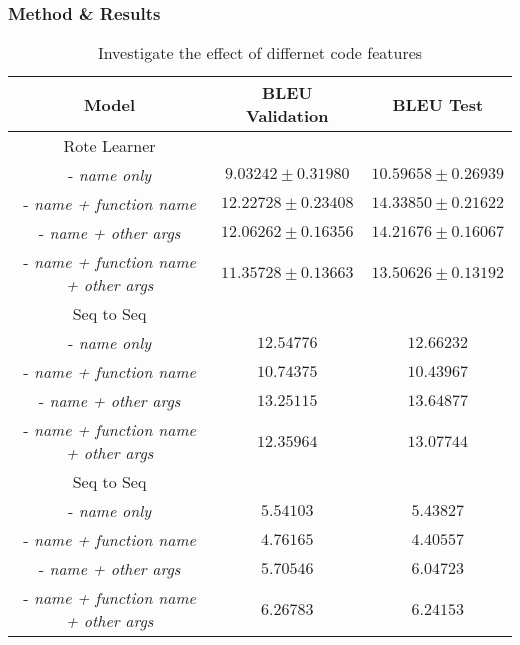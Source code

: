 \subsubsection{Method \& Results} %




\begin{table}[h!]
\begin{center}
\begin{tabular}{ c | c | c }
    Model                               & BLEU Validation            & BLEU Test  \\
    \hline
    \hline
    Rote Learner                        &                  & \\    
    - \textit{name only}                & $ 9.03242  \pm  0.31980 $ & $ 10.59658 \pm 0.26939 $  \\
    - \textit{name + function name}     & $ 12.22728 \pm  0.23408 $ & $ 14.33850 \pm 0.21622 $  \\
    - \textit{name + other args}        & $ 12.06262 \pm  0.16356 $ & $ 14.21676 \pm 0.16067 $  \\
    - \textit{name + function name + other args}  & $ 11.35728 \pm  0.13663 $ & $ 13.50626 \pm 0.13192 $ \\
    \hline
    \hline
    Seq to Seq                          &                  & \\
    - \textit{name only}                & $ 12.54776 $ & $ 12.66232 $  \\
    - \textit{name + function name}     & $ 10.74375 $ & $ 10.43967 $  \\
    - \textit{name + other args}        & $ 13.25115 $ & $ 13.64877 $  \\
    - \textit{name + function name + other args}    & $ 12.35964 $ & $ 13.07744 $  \\

    \hdashline
    Seq to Seq                          &                  & \\
    - \textit{name only}                & $ 5.54103 $ & $ 5.43827 $  \\
    - \textit{name + function name}     & $ 4.76165 $ & $ 4.40557 $  \\
    - \textit{name + other args}        & $ 5.70546 $ & $ 6.04723 $  \\
    - \textit{name + function name + other args}     & $ 6.26783 $ & $ 6.24153 $ \\
    
    \hline
\end{tabular}
\caption {Investigate the effect of differnet code features}
\label{table:tokenization}
\end{center}
\end{table}





